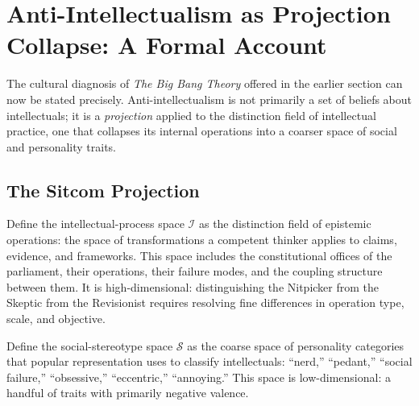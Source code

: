 \documentclass[12pt, letterpaper]{article}
\theoremstyle{remark}
\newcommand{\BBT}{\textit{The Big Bang Theory}}
\begin{document}
\section{Anti-Intellectualism as Projection Collapse: A Formal Account}

The cultural diagnosis of \BBT{} offered in the earlier section can now be
stated precisely.  Anti-intellectualism is not primarily a set of beliefs
about intellectuals; it is a \emph{projection} applied to the distinction
field of intellectual practice, one that collapses its internal operations
into a coarser space of social and personality traits.

\subsection{The Sitcom Projection}

Define the intellectual-process space $\mathcal{I}$ as the distinction
field of epistemic operations: the space of transformations a competent
thinker applies to claims, evidence, and frameworks.  This space includes
the constitutional offices of the parliament, their operations, their failure
modes, and the coupling structure between them.  It is high-dimensional:
distinguishing the Nitpicker from the Skeptic from the Revisionist requires
resolving fine differences in operation type, scale, and objective.

Define the social-stereotype space $\mathcal{S}$ as the coarse space of
personality categories that popular representation uses to classify
intellectuals: ``nerd,'' ``pedant,'' ``social failure,'' ``obsessive,''
``eccentric,'' ``annoying.''  This space is low-dimensional: a handful of
traits with primarily negative valence.
\end{document}
